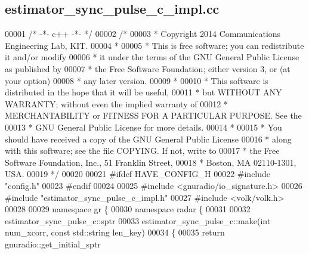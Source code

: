 \subsection{estimator\+\_\+sync\+\_\+pulse\+\_\+c\+\_\+impl.\+cc}
\label{estimator__sync__pulse__c__impl_8cc_source}

\begin{DoxyCode}
00001 \textcolor{comment}{/* -*- c++ -*- */}
00002 \textcolor{comment}{/* }
00003 \textcolor{comment}{ * Copyright 2014 Communications Engineering Lab, KIT.}
00004 \textcolor{comment}{ * }
00005 \textcolor{comment}{ * This is free software; you can redistribute it and/or modify}
00006 \textcolor{comment}{ * it under the terms of the GNU General Public License as published by}
00007 \textcolor{comment}{ * the Free Software Foundation; either version 3, or (at your option)}
00008 \textcolor{comment}{ * any later version.}
00009 \textcolor{comment}{ * }
00010 \textcolor{comment}{ * This software is distributed in the hope that it will be useful,}
00011 \textcolor{comment}{ * but WITHOUT ANY WARRANTY; without even the implied warranty of}
00012 \textcolor{comment}{ * MERCHANTABILITY or FITNESS FOR A PARTICULAR PURPOSE.  See the}
00013 \textcolor{comment}{ * GNU General Public License for more details.}
00014 \textcolor{comment}{ * }
00015 \textcolor{comment}{ * You should have received a copy of the GNU General Public License}
00016 \textcolor{comment}{ * along with this software; see the file COPYING.  If not, write to}
00017 \textcolor{comment}{ * the Free Software Foundation, Inc., 51 Franklin Street,}
00018 \textcolor{comment}{ * Boston, MA 02110-1301, USA.}
00019 \textcolor{comment}{ */}
00020 
00021 \textcolor{preprocessor}{#ifdef HAVE\_CONFIG\_H}
00022 \textcolor{preprocessor}{#include "config.h"}
00023 \textcolor{preprocessor}{#endif}
00024 
00025 \textcolor{preprocessor}{#include <gnuradio/io\_signature.h>}
00026 \textcolor{preprocessor}{#include "estimator_sync_pulse_c_impl.h"}
00027 \textcolor{preprocessor}{#include <volk/volk.h>}
00028 
00029 \textcolor{keyword}{namespace }gr \{
00030   \textcolor{keyword}{namespace }radar \{
00031 
00032     estimator_sync_pulse_c::sptr
00033     estimator_sync_pulse_c::make(\textcolor{keywordtype}{int} num\_xcorr, \textcolor{keyword}{const} std::string len\_key)
00034     \{
00035       \textcolor{keywordflow}{return} gnuradio::get\_initial\_sptr

\end{DoxyCode}
